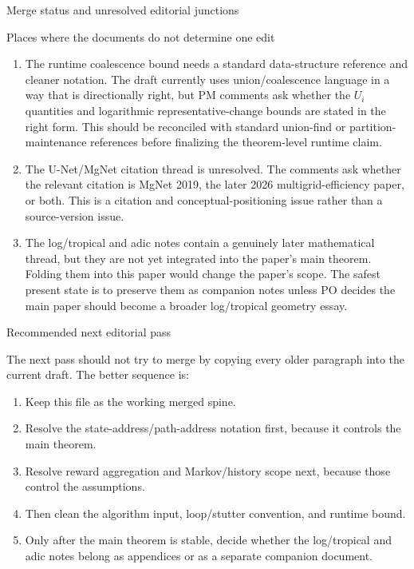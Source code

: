 \documentclass[11pt]{article}
\begin{document}
\begin{section}{Merge status and unresolved editorial junctions}
\begin{subsection}{Places where the documents do not determine one edit}
\begin{enumerate}
\item The runtime coalescence bound needs a standard data-structure reference
and cleaner notation.  The draft currently uses union/coalescence language in
a way that is directionally right, but PM comments ask whether the $U_i$
quantities and logarithmic representative-change bounds are stated in the
right form.  This should be reconciled with standard union-find or
partition-maintenance references before finalizing the theorem-level runtime
claim.

\item The U-Net/MgNet citation thread is unresolved.  The comments ask whether
the relevant citation is MgNet 2019, the later 2026 multigrid-efficiency paper,
or both.  This is a citation and conceptual-positioning issue rather than a
source-version issue.

\item The log/tropical and adic notes contain a genuinely later mathematical
thread, but they are not yet integrated into the paper's main theorem.  Folding
them into this paper would change the paper's scope.  The safest present
state is to preserve them as companion notes unless PO decides the main paper
should become a broader log/tropical geometry essay.
\end{enumerate}

\end{subsection}

\begin{subsection}{Recommended next editorial pass}

The next pass should not try to merge by copying every older paragraph into
the current draft.  The better sequence is:

\begin{enumerate}
\item Keep this file as the working merged spine.
\item Resolve the state-address/path-address notation first, because it
controls the main theorem.
\item Resolve reward aggregation and Markov/history scope next, because those
control the assumptions.
\item Then clean the algorithm input, loop/stutter convention, and runtime
bound.
\item Only after the main theorem is stable, decide whether the log/tropical
and adic notes belong as appendices or as a separate companion document.
\end{enumerate}

\end{subsection}

\end{section}





\end{document}

